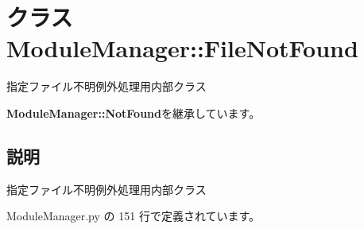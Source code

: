 \section{クラス ModuleManager::FileNotFound}
\label{classsource__py_1_1_module_manager_1_1_module_manager_1_1_file_not_found}
指定ファイル不明例外処理用内部クラス  


{\bf ModuleManager::NotFound}を継承しています。



\subsection{説明}
指定ファイル不明例外処理用内部クラス 

 ModuleManager.py の 151 行で定義されています。